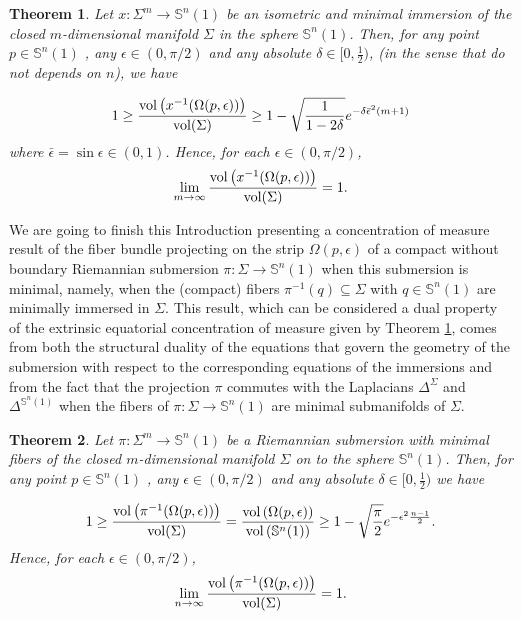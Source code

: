 \documentclass{amsart}
\newtheorem{theorem}{Theorem}[section]
\theoremstyle{definition}
\theoremstyle{remark}
\newcommand{\ese}{\mathbb{S}}
\begin{document}
\begin{theorem}\label{mainInt}
Let  $x: \Sigma^m \to \mathbb{S}^n(1)$ be an isometric and minimal immersion of the closed $m$-dimensional manifold $\Sigma$ in the sphere  $\mathbb{S}^n(1)$. Then, for any point $p \in \mathbb{S}^n(1)$ , any  $\epsilon \in (0,\pi/2)$ and any  absolute $\delta\in [0,\frac{1}{2})$, (in the sense that do not depends on $n$), we have 

\begin{equation}\label{eq4}
1\geq \frac{{\rm vol}\left(x^{-1}(\Omega(p,\epsilon))\right)}{{\rm vol}(\Sigma)}\geq  1- \sqrt{\frac{1}{1-2\delta}}e^{-\delta\bar\epsilon^2(m+1)}
\end{equation}
where $\bar\epsilon=\sin\epsilon \in (0,1)$. Hence, for each  $\epsilon \in (0,\pi/2)$,
\begin{equation}\label{eq5}
\lim_{m\to\infty}\frac{{\rm vol}\left(x^{-1}(\Omega(p,\epsilon))\right)}{{\rm vol}(\Sigma)}=1.
\end{equation}


\end{theorem}

We are going to finish this Introduction presenting a concentration of measure result of the fiber bundle projecting on the strip $\Omega(p, \epsilon)$ of a compact without boundary Riemannian submersion $\pi: \Sigma \rightarrow \ese^n(1)$ when this submersion is minimal, namely, when the (compact) fibers $\pi^{-1}(q) \subseteq \Sigma$ with $q \in \ese^n(1)$ are minimally immersed in $\Sigma$. This result, which can be considered a dual property of the extrinsic equatorial concentration of measure given by Theorem \ref{mainInt}, comes from both the structural duality of the equations that govern the geometry of the submersion with respect to the corresponding equations of the immersions and from the fact that the projection $\pi$ commutes with the Laplacians $\Delta^\Sigma$ and $\Delta^{\ese^n(1)}$ when the fibers of $\pi: \Sigma \rightarrow \ese^n(1)$ are minimal submanifolds of $\Sigma$.

\begin{theorem}\label{TeoSub}
Let  $\pi: \Sigma^m \to \mathbb{S}^n(1)$ be a Riemannian submersion with minimal fibers  of the closed $m$-dimensional manifold $\Sigma$ on to the sphere  $\mathbb{S}^n(1)$. Then, for any point $p \in \mathbb{S}^n(1)$ , any  $\epsilon \in (0,\pi/2)$ and any absolute $\delta\in [0,\frac{1}{2})$ we have 

\begin{equation}
1\geq \frac{{\rm vol}\left(\pi^{-1}(\Omega(p,\epsilon))\right)}{{\rm vol}(\Sigma)}=\frac{{\rm vol}\left(\Omega(p,\epsilon)\right)}{{\rm vol}\left(\mathbb{S}^n(1)\right)}\geq  1-\sqrt{\frac{\pi}{2}}e^{-\epsilon^2\frac{n-1}{2}}.
\end{equation}
Hence, for each  $\epsilon \in (0,\pi/2)$,
\begin{equation}
\lim_{n\to\infty}\frac{{\rm vol}\left(\pi^{-1}(\Omega(p,\epsilon))\right)}{{\rm vol}(\Sigma)}=1.
\end{equation}
\end{theorem}
\bigskip
\end{document}
